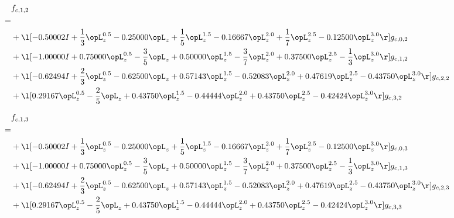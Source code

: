 \begin{alignat}{2} 
\label{eq:f_12_0} 
& f_{c,1,2} \nonumber \\ 
 = \\ 
& + \l[  -0.50002 I + \frac{1}{3} \opL_z^{0.5}   -0.25000 \opL_z + \frac{1}{5} \opL_z^{1.5}   -0.16667 \opL_z^{2.0} + \frac{1}{7} \opL_z^{2.5}   -0.12500 \opL_z^{3.0}  \r] g_{c,0,2} \nonumber \\ 
& + \l[  -1.00000 I +  0.75000 \opL_z^{0.5} - \frac{3}{5} \opL_z +  0.50000 \opL_z^{1.5} - \frac{3}{7} \opL_z^{2.0} +  0.37500 \opL_z^{2.5} - \frac{1}{3} \opL_z^{3.0}  \r] g_{c,1,2} \nonumber \\ 
& + \l[  -0.62494 I + \frac{2}{3} \opL_z^{0.5}   -0.62500 \opL_z +  0.57143 \opL_z^{1.5}   -0.52083 \opL_z^{2.0} +  0.47619 \opL_z^{2.5}   -0.43750 \opL_z^{3.0}  \r] g_{c,2,2} \nonumber \\ 
& + \l[  0.29167 \opL_z^{0.5} - \frac{2}{5} \opL_z +  0.43750 \opL_z^{1.5}   -0.44444 \opL_z^{2.0} +  0.43750 \opL_z^{2.5}   -0.42424 \opL_z^{3.0}  \r] g_{c,3,2} \nonumber \\ 
\end{alignat} 


\begin{alignat}{2} 
\label{eq:f_13_0} 
& f_{c,1,3} \nonumber \\ 
 = \\ 
& + \l[  -0.50002 I + \frac{1}{3} \opL_z^{0.5}   -0.25000 \opL_z + \frac{1}{5} \opL_z^{1.5}   -0.16667 \opL_z^{2.0} + \frac{1}{7} \opL_z^{2.5}   -0.12500 \opL_z^{3.0}  \r] g_{c,0,3} \nonumber \\ 
& + \l[  -1.00000 I +  0.75000 \opL_z^{0.5} - \frac{3}{5} \opL_z +  0.50000 \opL_z^{1.5} - \frac{3}{7} \opL_z^{2.0} +  0.37500 \opL_z^{2.5} - \frac{1}{3} \opL_z^{3.0}  \r] g_{c,1,3} \nonumber \\ 
& + \l[  -0.62494 I + \frac{2}{3} \opL_z^{0.5}   -0.62500 \opL_z +  0.57143 \opL_z^{1.5}   -0.52083 \opL_z^{2.0} +  0.47619 \opL_z^{2.5}   -0.43750 \opL_z^{3.0}  \r] g_{c,2,3} \nonumber \\ 
& + \l[  0.29167 \opL_z^{0.5} - \frac{2}{5} \opL_z +  0.43750 \opL_z^{1.5}   -0.44444 \opL_z^{2.0} +  0.43750 \opL_z^{2.5}   -0.42424 \opL_z^{3.0}  \r] g_{c,3,3} \nonumber \\ 
\end{alignat} 


